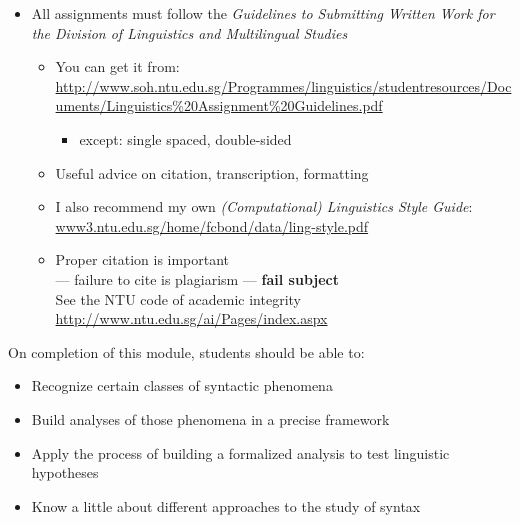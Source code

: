 \documentclass[a4paper,landscape,headrule,footrule]{foils}
\begin{document}
\begin{itemize}
\item All assignments must follow the \textit{Guidelines to Submitting Written Work for the Division of Linguistics and Multilingual Studies}
  \begin{itemize}
  \item You can get it from:
    \url{http://www.soh.ntu.edu.sg/Programmes/linguistics/studentresources/Documents/Linguistics%20Assignment%20Guidelines.pdf}
      \begin{itemize}
      \item except: single spaced, double-sided
      \end{itemize}
  \item Useful advice on citation, transcription, formatting
  \item I also recommend my own \textit{(Computational) Linguistics Style Guide}:
 \url{www3.ntu.edu.sg/home/fcbond/data/ling-style.pdf}
  \item Proper citation is important 
    \\ --- failure to cite is plagiarism --- \textbf{fail subject}
 \\ See the NTU code of academic integrity 
 \\\url{http://www.ntu.edu.sg/ai/Pages/index.aspx}
  \end{itemize}
\end{itemize}





On completion of this module, students should be able to:
\begin{itemize}
\item Recognize certain classes of syntactic phenomena
\item Build analyses of those phenomena in a precise framework
\item Apply the process of building a formalized analysis to test
  linguistic hypotheses
\item Know a little about different approaches to the study of syntax
\end{itemize}
    
\end{document}

